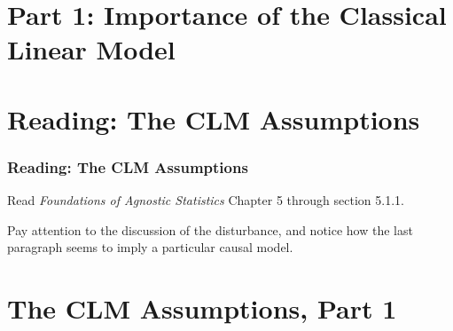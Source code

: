 \documentclass[12pt, block=fill]{beamer}
\begin{document}
\section{Part 1: Importance of the Classical Linear Model}


\section{Reading: The CLM Assumptions}

\begin{frame}
  \frametitle{Reading: The CLM Assumptions}
  Read \textit{Foundations of Agnostic Statistics} Chapter 5 through section 5.1.1.
  
  Pay attention to the discussion of the disturbance, and notice how the last paragraph seems to imply a particular causal model. 
  \end{frame}


\section{The CLM Assumptions, Part 1}

\end{document}
